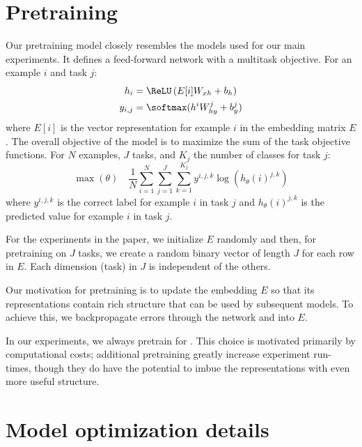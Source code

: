 \section{Pretraining}\label{app:pretraining}

Our pretraining model closely resembles the models used for our main experiments. It defines a feed-forward network with a multitask objective. For an example $i$ and task $j$:
%
\begin{align}
  h_{i} &= \ReLU\left( E[i]W_{xh} + b_{h} \right) \\
  y_{i,j} &= \softmax(h^{i}W_{hy}^{j} + b_{y}^{j})
\end{align}
%
where $E[i]$ is the vector representation for example $i$ in the embedding matrix $E$. The overall objective of the model is to maximize the sum of the task objective functions. For $N$ examples, $J$ tasks, and $K_{j}$ the number of classes for task $j$:
%
\begin{equation}
  \max(\theta)
  \quad
  \frac{1}{N}
  \sum_{i=1}^{N}
  \sum_{j=1}^{J}
  \sum_{k=1}^{K_{j}}
  y^{i,j,k} \log \left( h_{\theta}(i)^{j,k} \right)
\end{equation}
%
where $y^{i,j,k}$ is the correct label for example $i$ in task $j$ and $h_{\theta}(i)^{j,k}$ is the predicted value for example $i$ in task $j$.

For the experiments in the paper, we initialize $E$ randomly and then, for pretraining on $J$ tasks, we create a random binary vector of length $J$ for each row in $E$. Each dimension (task) in $J$ is independent of the others.

Our motivation for pretraining is to update the embedding $E$ so that its representations contain rich structure that can be used by subsequent models. To achieve this, we backpropagate errors through the network and into $E$.

In our experiments, we always pretrain for . This choice is motivated primarily by computational costs; additional pretraining  greatly increase experiment run-times, though they do have the potential to imbue the representations with even more useful structure. 


\section{Model optimization details}\label{app:optimization}

